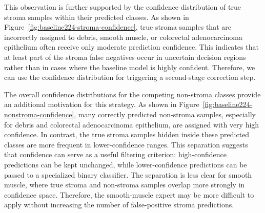 This observation is further supported by the confidence distribution of true
stroma samples within their predicted classes. As shown in
Figure~\ref{fig:baseline224-stroma-confidence}, true stroma samples that are incorrectly assigned to
debris, smooth muscle, or colorectal adenocarcinoma epithelium often receive
only moderate prediction confidence. This indicates that at least part of the
stroma false negatives occur in uncertain decision regions rather than in cases
where the baseline model is highly confident. Therefore, we can use the
confidence distribution for triggering a second-stage correction step.


The overall confidence distributions for the competing non-stroma classes
provide an additional motivation for this strategy. As shown in
Figure~\ref{fig:baseline224-nonstroma-confidence}, many correctly predicted non-stroma samples,
especially for debris and colorectal adenocarcinoma epithelium, are assigned
with very high confidence. In contrast, the true stroma samples hidden inside
these predicted classes are more frequent in lower-confidence ranges. This
separation suggests that confidence can serve as a useful filtering criterion:
high-confidence predictions can be kept unchanged, while lower-confidence
predictions can be passed to a specialized binary classifier. The separation is
less clear for smooth muscle, where true stroma and non-stroma samples overlap
more strongly in confidence space. Therefore, the smooth-muscle expert may be
more difficult to apply without increasing the number of false-positive stroma
predictions.


